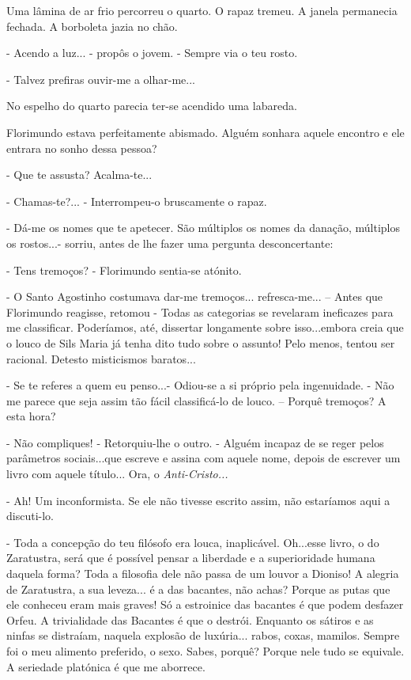 Uma lâmina de ar frio percorreu o quarto. O rapaz tremeu. A janela
permanecia fechada. A borboleta jazia no chão.

- Acendo a luz... - propôs o jovem. - Sempre via o teu rosto.

- Talvez prefiras ouvir-me a olhar-me...

No espelho do quarto parecia ter-se acendido uma labareda.

Florimundo estava perfeitamente abismado. Alguém sonhara aquele encontro
e ele entrara no sonho dessa pessoa?

- Que te assusta? Acalma-te...

- Chamas-te?... - Interrompeu-o bruscamente o rapaz.

- Dá-me os nomes que te apetecer. São múltiplos os nomes da danação,
múltiplos os rostos...- sorriu, antes de lhe fazer uma pergunta
desconcertante:

- Tens tremoços? - Florimundo sentia-se atónito.

- O Santo Agostinho costumava dar-me tremoços... refresca-me... -- Antes
que Florimundo reagisse, retomou - Todas as categorias se revelaram
ineficazes para me classificar. Poderíamos, até, dissertar longamente
sobre isso...embora creia que o louco de Sils Maria já tenha dito tudo
sobre o assunto! Pelo menos, tentou ser racional. Detesto misticismos
baratos...

- Se te referes a quem eu penso...- Odiou-se a si próprio pela
ingenuidade. - Não me parece que seja assim tão fácil classificá-lo de
louco. -- Porquê tremoços? A esta hora?

- Não compliques! - Retorquiu-lhe o outro. - Alguém incapaz de se reger
pelos parâmetros sociais...que escreve e assina com aquele nome, depois
de escrever um livro com aquele título... Ora, o \emph{Anti-Cristo...}

- Ah! Um inconformista. Se ele não tivesse escrito assim, não estaríamos
aqui a discuti-lo.

- Toda a concepção do teu filósofo era louca, inaplicável. Oh...esse
livro, o do Zaratustra, será que é possível pensar a liberdade e a
superioridade humana daquela forma? Toda a filosofia dele não passa de
um louvor a Dioniso! A alegria de Zaratustra, a sua leveza... é a das
bacantes, não achas? Porque as putas que ele conheceu eram mais graves!
Só a estroinice das bacantes é que podem desfazer Orfeu. A trivialidade
das Bacantes é que o destrói. Enquanto os sátiros e as ninfas se
distraíam, naquela explosão de luxúria... rabos, coxas, mamilos. Sempre
foi o meu alimento preferido, o sexo. Sabes, porquê? Porque nele tudo se
equivale. A seriedade platónica é que me aborrece.

